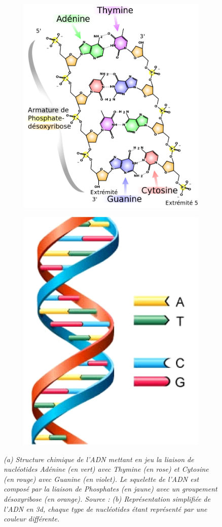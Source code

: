 \begin{figure}
  \begin{subfigure}{.6\textwidth}
  \centering
  {\includegraphics[width=0.5\linewidth]{./figures/ch1/dna_structure}}
    \caption{}
    \label{Fig:dna_structure}
  \end{subfigure}
  \begin{subfigure}{.4\textwidth}
  \centering
  {\includegraphics[width=0.6\linewidth]{./figures/ch1/dna_structure_3d}}
    \caption{}
    \label{Fig:dna_structure_3d}
  \hspace{0.2cm}
  \end{subfigure}
  \caption[(a) Structure ADN 2d / (b) Structure ADN 3d]{\it (a) Structure chimique de l'ADN mettant en jeu la liaison de nucléotides Adénine (en vert) avec Thymine (en rose) et Cytosine (en rouge) avec Guanine (en violet). Le squelette de l'ADN est composé par la liaison de Phosphates (en jaune) avec un groupement désoxyribose (en orange). Source : \cite{en:user:madprime_dna_chemical_structure_fr_2007}
  (b) Représentation simplifiée de l'ADN en 3d, chaque type de nucléotides étant représenté par une couleur différente.}
\end{figure}

